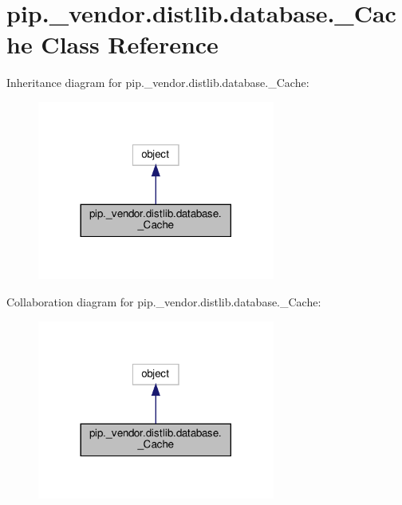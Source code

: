 \hypertarget{classpip_1_1__vendor_1_1distlib_1_1database_1_1__Cache}{}\section{pip.\+\_\+vendor.\+distlib.\+database.\+\_\+\+Cache Class Reference}
\label{classpip_1_1__vendor_1_1distlib_1_1database_1_1__Cache}


Inheritance diagram for pip.\+\_\+vendor.\+distlib.\+database.\+\_\+\+Cache\+:
\nopagebreak
\begin{figure}[H]
\begin{center}
\leavevmode
\includegraphics[width=221pt]{classpip_1_1__vendor_1_1distlib_1_1database_1_1__Cache__inherit__graph}
\end{center}
\end{figure}


Collaboration diagram for pip.\+\_\+vendor.\+distlib.\+database.\+\_\+\+Cache\+:
\nopagebreak
\begin{figure}[H]
\begin{center}
\leavevmode
\includegraphics[width=221pt]{classpip_1_1__vendor_1_1distlib_1_1database_1_1__Cache__coll__graph}
\end{center}
\end{figure}
